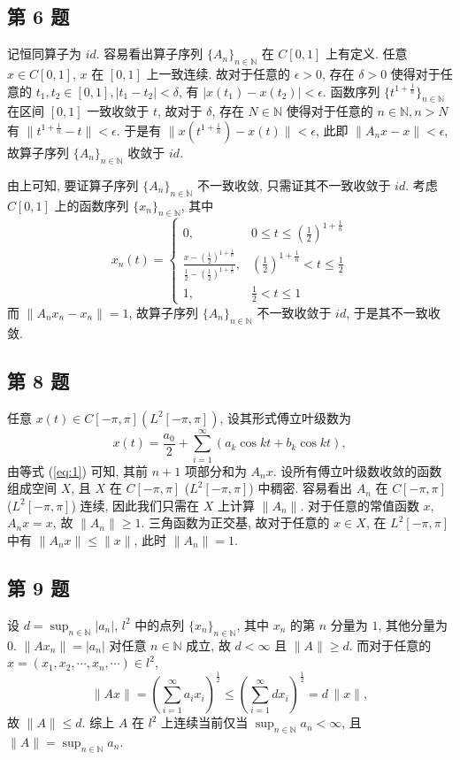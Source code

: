 \documentclass[../main.tex]{subfiles}
\begin{document}
\subsection{第 6 题}
记恒同算子为 $id$.
容易看出算子序列 $\{ A_{n} \}_{n \in \mathbb{N}}$ 在 $C[0, 1]$ 上有定义.
任意 $x \in C[0, 1]$, $x$ 在 $[0,1]$ 上一致连续.
故对于任意的 $\epsilon > 0$,
存在 $\delta > 0$ 使得对于任意的 $t_1, t_2 \in [0, 1], | t_1 - t_2| < \delta$,
有 $| x(t_1) - x(t_2) | < \epsilon$.
函数序列 $\{ t^{1 + \frac{1}{n}} \}_{n \in \mathbb{N}}$ 在区间 $[0, 1]$ 一致收敛于 $t$,
故对于 $\delta$, 存在 $N \in \mathbb{N}$ 使得对于任意的 $n \in \mathbb{N}, n > N$ 有 $\| t^{1 + \frac{1}{n}} - t \| < \epsilon$.
于是有 $\| x(t^{1 + \frac{1}{n}}) - x(t) \| < \epsilon$,
此即 $\| A_n x - x \| < \epsilon$, 故算子序列 $\{ A_{n} \}_{n \in \mathbb{N}}$ 收敛于 $id$.

由上可知, 要证算子序列 $\{ A_{n} \}_{n \in \mathbb{N}}$ 不一致收敛, 只需证其不一致收敛于 $id$.
考虑 $C[0, 1]$ 上的函数序列 $\{ x_{n} \}_{n \in \mathbb{N}}$, 其中
\[
    x_n(t) = \begin{cases}
        0, & 0 \leqslant t \leqslant \left( \frac{1}{2} \right)^{1 + \frac{1}{n}} \\
        \frac{x - \left( \frac{1}{2} \right)^{1 + \frac{1}{n}}}{\frac{1}{2} - \left( \frac{1}{2} \right)^{1 + \frac{1}{n}}}, & \left( \frac{1}{2} \right)^{1 + \frac{1}{n}} < t \leqslant \frac{1}{2} \\
        1, & \frac{1}{2} < t \leqslant 1
    \end{cases}
\]
而 $\| A_n x_n - x_n \| = 1$, 故算子序列 $\{ A_{n} \}_{n \in \mathbb{N}}$ 不一致收敛于 $id$, 于是其不一致收敛.

\subsection{第 8 题}
任意 $x(t) \in C[-\pi, \pi] (L^2[-\pi, \pi])$, 设其形式傅立叶级数为
\[
    x(t) = \frac{a_0}{2} + \sum_{i = 1}^{\infty}(a_k \cos{kt} + b_k \cos{kt}),
\]
由等式 (\ref{eq:1}) 可知, 其前 $n + 1$ 项部分和为 $A_n x$.
设所有傅立叶级数收敛的函数组成空间 $X$, 且 $X$ 在 $C[-\pi, \pi]$ ($L^2[-\pi, \pi]$) 中稠密.
容易看出 $A_n$ 在 $C[-\pi, \pi]$ ($L^2[-\pi, \pi]$) 连续, 因此我们只需在 $X$ 上计算 $\| A_n \|$.
对于任意的常值函数 $x$, $A_n x = x$, 故 $\| A_n \| \geqslant 1$.
三角函数为正交基, 故对于任意的 $x \in X$,
在 $L^2[-\pi, \pi]$ 中有 $\| A_n x \| \leqslant \| x \|$, 此时 $\| A_n \| = 1$.

\subsection{第 9 题}
设 $d = \sup_{n \in \mathbb{N}} | a_n |$,
$l^2$ 中的点列 $\{ x_n \}_{n \in \mathbb{N}}$, 其中 $x_n$ 的第 $n$ 分量为 $1$, 其他分量为 $0$.
$\| A x_n \| = | a_n |$ 对任意 $n \in \mathbb{N}$ 成立,
故 $d < \infty$ 且 $\| A \| \geqslant d$.
而对于任意的 $x = (x_1, x_2, \cdots, x_n, \cdots)\in l^2$,
\[
    \| A x \| = \left( \sum_{i = 1}^{\infty} a_i x_i \right)^{\frac{1}{2}}
    \leqslant \left( \sum_{i = 1}^{\infty} d x_i \right)^{\frac{1}{2}}
    = d \, \| x \|,
\]
故 $\| A \| \leqslant d$.
综上 $A$ 在 $l^2$ 上连续当前仅当 $\sup_{n \in \mathbb{N}} a_n < \infty$,
且 $\| A \| = \sup_{n \in \mathbb{N}} a_n$.
\end{document}
